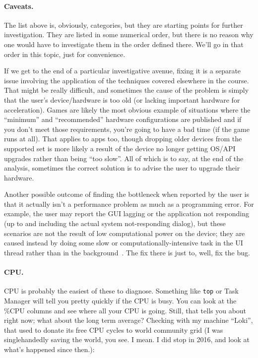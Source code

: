\paragraph{Caveats.}
The list above is, obviously, categories, but they are starting points for further investigation. They are listed in some numerical order, but there is no reason why one would have to investigate them in the order defined there. We'll go in that order in this topic, just for convenience.

If we get to the end of a particular investigative avenue, fixing it is a separate issue involving the application of the techniques covered elsewhere in the course. That might be really difficult, and sometimes the cause of the problem is simply that the user's device/hardware is too old (or lacking important hardware for acceleration). Games are likely the most obvious example of situations where the ``minimum'' and ``recommended'' hardware configurations are published and if you don't meet those requirements, you're going to have a bad time (if the game runs at all). That applies to apps too, though dropping older devices from the supported set is more likely a result of the device no longer getting OS/API upgrades rather than being ``too slow''. All of which is to say, at the end of the analysis, sometimes the correct solution is to advise the user to upgrade their hardware.

Another possible outcome of finding the bottleneck when reported by the user is that it actually isn't a performance problem as much as a programming error. For example, the user may report the GUI lagging or the application not responding (up to and including the actual system not-responding dialog), but these scenarios are not the result of low computational power on the device; they are caused instead by doing some slow or computationally-intensive task in the UI thread rather than in the background~\cite{bottlenecks-android}. The fix there is just to, well, fix the bug.


\paragraph{CPU.} CPU is probably the easiest of these to diagnose. Something like \texttt{top} or Task Manager will tell you pretty quickly if the CPU is busy. You can look at the \%CPU columns and see where all your CPU is going. Still, that tells you about right now; what about the long term average? Checking with my machine ``Loki'', that used to donate its free CPU cycles to world community grid (I was singlehandedly saving the world, you see. I mean. I did stop in 2016, and look at what's happened since then.):

